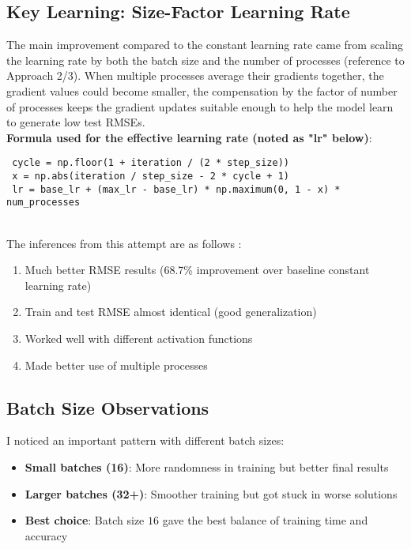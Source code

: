 \documentclass{article}
\begin{document}
\subsection{Key Learning: Size-Factor Learning Rate}
The main improvement compared to the constant learning rate came from scaling the learning rate by both the batch size and the number of processes (reference to Approach 2/3). When multiple processes average their gradients together, the gradient values could become smaller, the compensation by the factor of number of processes keeps the gradient updates suitable enough to help the model learn to generate low test RMSEs.\\

\textbf{Formula used for the effective learning rate (noted as "lr" below)}:
\begin{lstlisting}
 cycle = np.floor(1 + iteration / (2 * step_size))
 x = np.abs(iteration / step_size - 2 * cycle + 1)
 lr = base_lr + (max_lr - base_lr) * np.maximum(0, 1 - x) * num_processes
\end{lstlisting} \\

The inferences from this attempt are as follows :
\begin{enumerate}
    \item Much better RMSE results (68.7\% improvement over baseline constant learning rate)
    \item Train and test RMSE almost identical (good generalization)  
    \item Worked well with different activation functions
    \item Made better use of multiple processes
\end{enumerate}

\subsection{Batch Size Observations}
I noticed an important pattern with different batch sizes:

\begin{itemize}
    \item \textbf{Small batches (16)}: More randomness in training but better final results
    \item \textbf{Larger batches (32+)}: Smoother training but got stuck in worse solutions
    \item \textbf{Best choice}: Batch size $16$ gave the best balance of training time and accuracy
\end{itemize}
\end{document}

